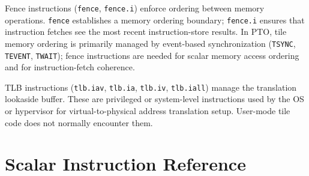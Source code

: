 Fence instructions (\texttt{fence}, \texttt{fence.i}) enforce ordering between memory operations. \texttt{fence} establishes a memory ordering boundary; \texttt{fence.i} ensures that instruction fetches see the most recent instruction-store results. In PTO, tile memory ordering is primarily managed by event-based synchronization (\texttt{TSYNC}, \texttt{TEVENT}, \texttt{TWAIT}); fence instructions are needed for scalar memory access ordering and for instruction-fetch coherence.

TLB instructions (\texttt{tlb.iav}, \texttt{tlb.ia}, \texttt{tlb.iv}, \texttt{tlb.iall}) manage the translation lookaside buffer. These are privileged or system-level instructions used by the OS or hypervisor for virtual-to-physical address translation setup. User-mode tile code does not normally encounter them.

\section{Scalar Instruction Reference}

